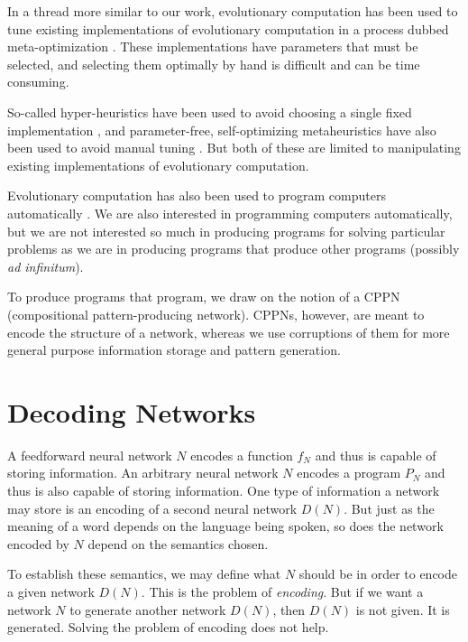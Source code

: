 \documentclass[12pt]{article}
\newcommand{\term}[1]{\emph{#1}}
\begin{document}
In a thread more similar to our work,
evolutionary computation has been used
to tune existing implementations
of evolutionary computation
in a process dubbed meta-optimization
\cite{brest2006param}.
These implementations
have parameters that must be selected,
and selecting them optimally by hand is difficult
and can be time consuming.

So-called hyper-heuristics
have been used to avoid choosing a single fixed implementation
\cite{burke2010classification},
and parameter-free, self-optimizing metaheuristics
have also been used to avoid
manual tuning \cite{brest2006param}.
But both of these are limited
to manipulating existing implementations
of evolutionary computation.

Evolutionary computation
has also been used to program computers automatically
\cite{koza1999genetic}.
We are also interested in programming computers automatically,
but we are not interested so much
in producing programs
for solving particular problems
as we are in producing programs
that produce other programs
(possibly \textit{ad infinitum}).

To produce programs that program,
we draw on the notion of a CPPN (compositional
pattern-producing network).\cite{stanley2007cppn}
CPPNs, however, are meant to encode the structure
of a network, whereas we use corruptions of them
for more general purpose information storage
and pattern generation.


\section{Decoding Networks}
\label{problemstatement}

A feedforward neural network $N$ encodes a function $f_N$
and thus is capable of storing information.
An arbitrary neural network $N$ encodes a program $P_N$
and thus is also capable of storing information.
One type of information a network may store
is an encoding of a second neural network $D(N)$.
But just as the meaning of a word
depends on the language being spoken,
so does the network encoded by $N$
depend on the semantics chosen.

To establish these semantics,
we may define what $N$ should be
in order to encode a given network $D(N)$.
This is the problem of \term{encoding}.
But if we want a network $N$
to generate another network $D(N)$,
then $D(N)$ is not given.
It is generated.
Solving the problem of encoding does not help.
\end{document}

